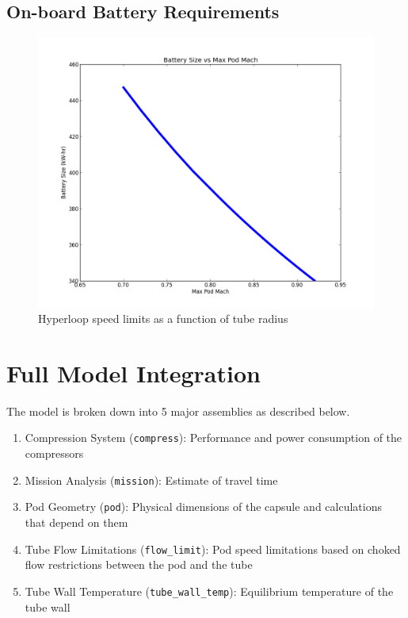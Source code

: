 \documentclass[heading.tex]{subfiles}
\begin{document}
\subsection{On-board Battery Requirements}

\begin{figure}[hbtp]
\centering
\includegraphics[scale=0.5]{images/mach_vs_energy.png}
\caption{Hyperloop speed limits as a function of tube radius}
\end{figure}




\section{Full Model Integration}
The model is broken down into 5 major assemblies as described below. 

\begin{enumerate}
  \item Compression System (\texttt{compress}): Performance and power consumption of the compressors
  \item Mission Analysis (\texttt{mission}): Estimate of travel time
  \item Pod Geometry (\texttt{pod}): Physical dimensions of the capsule and calculations that depend on them
  \item Tube Flow Limitations (\texttt{flow\_limit}): Pod speed limitations based on choked flow restrictions between the pod and the tube
  \item Tube Wall Temperature (\texttt{tube\_wall\_temp}): Equilibrium temperature of the tube wall
\end{enumerate}
\end{document}
